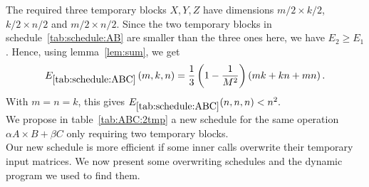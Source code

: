 \documentclass{article}
\renewcommand{\geq}{\geqslant}
\begin{document}
The required three temporary blocks $X, Y, Z$ have dimensions $m/2\times
k/2$, $k/2 \times n/2$ and $m/2 \times n/2$. Since the two temporary blocks in schedule~\ref{tab:schedule:AB} 
are smaller than the three ones here, we have $E_2 \geq E_1$.
Hence, using lemma~\ref{lem:sum}, we get
\begin{equation}\label{Eq:schedule:ABC}
	E_{\ref{tab:schedule:ABC}}\left(m,k,n\right) = \frac{1}{3} \left( 1 - \frac{1}{M^2}\right) \left(mk+kn+mn \right).
\end{equation}
With $m=n=k$, this gives $E_{\ref{tab:schedule:ABC}}(n,n,n) < n^2.$\\
We propose in table~\ref{tab:ABC:2tmp} a new schedule for the same operation
$\alpha A\times B + \beta C$ only requiring two temporary blocks.\\
Our new schedule is more efficient if some inner calls overwrite their
temporary input matrices. We now present some overwriting schedules
and the dynamic program we used to find them.
\end{document}

